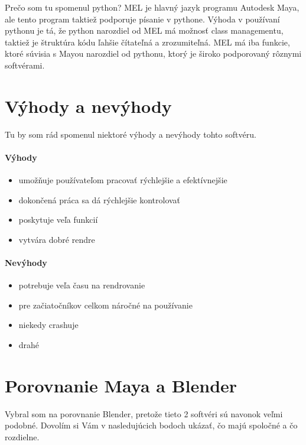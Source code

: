\documentclass[10pt,oneside,slovak,a4paper]{article}
\begin{document}
Prečo som tu spomenul python? MEL je hlavný jazyk programu Autodesk Maya, ale tento program taktiež podporuje písanie v pythone. Výhoda v používaní pythonu je tá, že python narozdiel od MEL má možnosť class managementu, taktiež je štruktúra kódu ľahšie čítateľná a zrozumiteľná. MEL má iba funkcie, ktoré súvisia s Mayou narozdiel od pythonu, ktorý je široko podporovaný rôznymi softvérami.\cite{evaluationmaya}



\section{Výhody a nevýhody} \label{vyhnevyh}
Tu by som rád spomenul niektoré výhody a nevýhody tohto softvéru.

\paragraph{Výhody}
\begin{itemize}
\item umožňuje používateľom pracovať rýchlejšie a efektívnejšie
\item dokončená práca sa dá rýchlejšie kontrolovať\cite{educbaa2021}
\item poskytuje veľa funkcií
\item vytvára dobré rendre
\end{itemize}

\paragraph{Nevýhody}
\begin{itemize}
\item potrebuje veľa času na rendrovanie
\item pre začiatočníkov celkom náročné na používanie
\item niekedy crashuje
\item drahé
\end{itemize}

\section{Porovnanie Maya a Blender} \label{porovnanie}

Vybral som na porovnanie Blender, pretože tieto 2 softvéri sú navonok veľmi podobné. Dovolím si Vám v nasledujúcich bodoch ukázať, čo majú spoločné a čo rozdielne.
\end{document}
